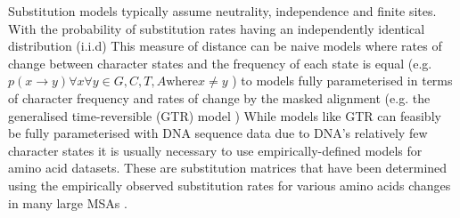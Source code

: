 Substitution models typically assume neutrality, independence and finite sites.
With the probability of substitution rates having an independently identical distribution (i.i.d) \citep{Hasegawa1985}
This measure of distance can be naive models where rates of change between character
states and the frequency of each state is equal (e.g. \(p(x \rightarrow y) \forall x \forall y \in {G,C,T,A} \text{where} x\neq y\)
\citep{jukes1969evolution}) to models fully parameterised in terms of character frequency and rates of change by the masked alignment 
(e.g. the generalised time-reversible (GTR) model \citep{Tavare1986})
%
%
%
%
%
%
%
%
%
%
%
While models like GTR can feasibly be fully parameterised with DNA sequence
data due to DNA's relatively few character states it is usually necessary
to use empirically-defined models for amino acid datasets.  These are substitution
matrices that have been determined using the empirically observed
substitution rates for various amino acids changes in many large MSAs \citep{Le2008}.


